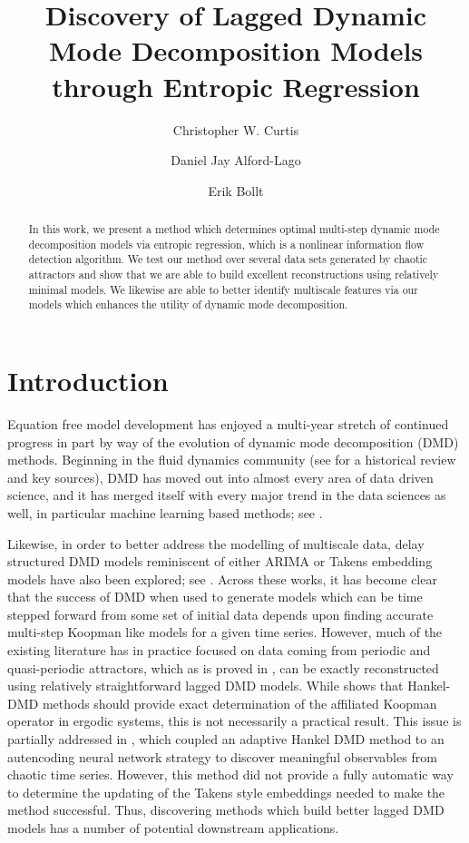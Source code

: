 \documentclass[a4paper,11pt]{article}
\title{Discovery of Lagged Dynamic Mode Decomposition Models through Entropic Regression}
\author[1]{Christopher W. Curtis}
\author[1,2]{Daniel Jay Alford-Lago}
\author[3,4]{Erik Bollt}
\affil[1]{Department of Mathematics and Statistics, SDSU}
\affil[2]{Naval Information Warfare Center}
\affil[3]{Department of Electrical and Computer Engineering, Clarkson University}
\affil[4]{Clarkson Center for Complex Systems Science, Clarkson University}
\date{}
\begin{document}
\maketitle

\begin{abstract}
In this work, we present a method which determines optimal multi-step dynamic mode decomposition models via entropic regression, which is a nonlinear information flow detection algorithm.  We test our method over several data sets generated by chaotic attractors and show that we are able to build excellent reconstructions using relatively minimal models.  We likewise are able to better identify multiscale features via our models which enhances the utility of dynamic mode decomposition.   
\end{abstract}

\section{Introduction}

Equation free model development has enjoyed a multi-year stretch of continued progress in part by way of the evolution of dynamic mode decomposition (DMD) methods.  Beginning in the fluid dynamics community (see \cite{taira} for a historical review and key sources), DMD has moved out into almost every area of data driven science, and it has merged itself with every major trend in the data sciences as well, in particular machine learning based methods; see \cite{lusch, azencot, lago_dldmd}.  

Likewise, in order to better address the modelling of multiscale data, delay structured DMD models reminiscent of either ARIMA or Takens embedding models have also been explored; see \cite{arbabi, clainche, duraisamy, champion2, kutz4, curtis_dldmd}.  Across these works, it has become clear that the success of DMD when used to generate models which can be time stepped forward from some set of initial data depends upon finding accurate multi-step Koopman like models for a given time series.  However, much of the existing literature has in practice focused on data coming from periodic and quasi-periodic attractors, which as is proved in \cite{duraisamy}, can be exactly reconstructed using relatively straightforward lagged DMD models.  While \cite{arbabi} shows that Hankel-DMD methods should provide exact determination of the affiliated Koopman operator in ergodic systems, this is not necessarily a practical result.  This issue is partially addressed in \cite{curtis_dldmd}, which coupled an adaptive Hankel DMD method to an autencoding neural network strategy to discover meaningful observables from chaotic time series.  However, this method did not provide a fully automatic way to determine the updating of the Takens style embeddings needed to make the method successful.  Thus, discovering methods which build better lagged DMD models has a number of potential downstream applications.  
\end{document}
